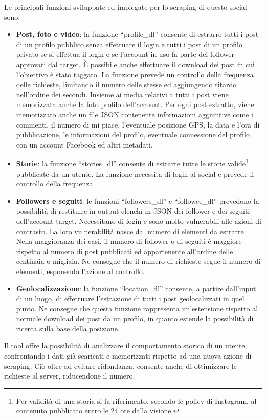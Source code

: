 Le principali funzioni sviluppate ed impiegate per lo scraping di questo social sono:
\begin{itemize}
    \item \textbf{Post, foto e video}: la funzione ``profile\_dl'' consente di estrarre tutti i post di un profilo pubblico senza effettuare il login e tutti i post di un profilo privato se si effettua il login e se l'account in uso fa parte dei follower approvati dal target. \`E possibile anche effettuare il download dei post in cui l'obiettivo \`e stato taggato. La funzione prevede un controllo della frequenza delle richieste, limitando il numero delle stesse ed aggiungendo ritardo nell'ordine dei secondi. Insieme ai media relativi a tutti i post viene memorizzata anche la foto profilo dell'account.
    Per ogni post estratto, viene memorizzato anche un file JSON contenente informazioni aggiuntive come i commenti, il numero di mi piace, l'eventuale posizione GPS, la data e l'ora di pubblicazione, le informazioni del profilo, eventuale connessione del profilo con un account Facebook ed altri metadati. 
    \item \textbf{Storie}: la funzione ``stories\_dl'' consente di estrarre tutte le storie valide\footnote{Per validit\`a di una storia si fa riferimento, secondo le policy di Instagram, al contenuto pubblicato entro le 24 ore dalla visione.} pubblicate da un utente. La funzione necessita di login al social e prevede il controllo della frequenza. 
    \item \textbf{Followers e seguiti}: le funzioni ``followers\_dl'' e ``followee\_dl'' prevedono la possibilit\`a di restituire in output elenchi in JSON dei follower e dei seguiti dell'account target. Necessitano di login e sono molto vulnerabili alle azioni di contrasto. La loro vulnerabilit\`a nasce dal numero di elementi da estrarre. Nella maggioranza dei casi, il numero di follower o di seguiti \`e maggiore rispetto al numero di post pubblicati ed appartenente all'ordine delle centinaia o migliaia. Ne consegue che il numero di richieste segue il numero di elementi, esponendo l'azione al controllo.
    \item \textbf{Geolocalizzazione}: la funzione ``location\_dl'' consente, a partire dall'input di un luogo, di effettuare l'estrazione di tutti i post geolocalizzati in quel punto. Ne consegue che questa funzione rappresenta un'estensione rispetto al normale download dei post da un profilo, in quanto estende la possibilit\`a di ricerca sulla base della posizione.
\end{itemize}
Il tool offre la possibilit\`a di analizzare il comportamento storico di un utente, confrontando i dati gi\`a scaricati e memorizzati rispetto ad una nuova azione di scraping. Ci\`o oltre ad evitare ridondanza, consente anche di ottimizzare le richieste al server, riducendone il numero.

